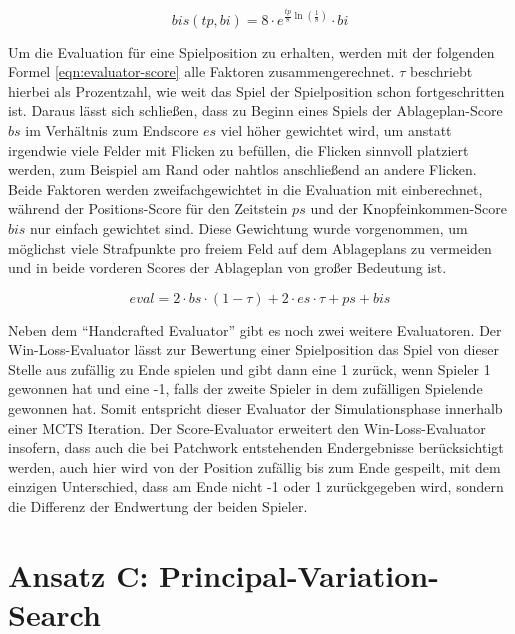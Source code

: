 \begin{equation}
    \label{eqn:button-income-score}
    bis(tp, bi) = 8 \cdot e^{\frac{tp}{8}\ln\left(\frac{1}{8}\right)} \cdot bi
\end{equation}

Um die Evaluation für eine Spielposition zu erhalten, werden mit der folgenden Formel \ref{eqn:evaluator-score} alle Faktoren zusammengerechnet. $\tau$ beschriebt hierbei als Prozentzahl, wie weit das Spiel der Spielposition schon fortgeschritten ist. Daraus lässt sich schließen, dass zu Beginn eines Spiels der Ablageplan-Score $bs$ im Verhältnis zum Endscore $es$ viel höher gewichtet wird, um anstatt irgendwie viele Felder mit Flicken zu befüllen, die Flicken sinnvoll platziert werden, zum Beispiel am Rand oder nahtlos anschließend an andere Flicken. Beide Faktoren werden zweifachgewichtet in die Evaluation mit einberechnet, während der Positions-Score für den Zeitstein $ps$ und der Knopfeinkommen-Score $bis$ nur einfach gewichtet sind. Diese Gewichtung wurde vorgenommen, um möglichst viele Strafpunkte pro freiem Feld auf dem Ablageplans zu vermeiden und in beide vorderen Scores der Ablageplan von großer Bedeutung ist.

\begin{equation}
    \label{eqn:evaluator-score}
    eval = 2 \cdot bs \cdot (1 - \tau) + 2 \cdot es \cdot \tau + ps + bis
\end{equation}

Neben dem \enquote{Handcrafted Evaluator} gibt es noch zwei weitere Evaluatoren. Der Win-Loss-Evaluator lässt zur Bewertung einer Spielposition das Spiel von dieser Stelle aus zufällig zu Ende spielen und gibt dann eine 1 zurück, wenn Spieler 1 gewonnen hat und eine -1, falls der zweite Spieler in dem zufälligen Spielende gewonnen hat. Somit entspricht dieser Evaluator der Simulationsphase innerhalb einer \ac{MCTS} Iteration. Der Score-Evaluator erweitert den Win-Loss-Evaluator insofern, dass auch die bei Patchwork entstehenden Endergebnisse berücksichtigt werden, \dash auch hier wird von der Position zufällig bis zum Ende gespeilt, mit dem einzigen Unterschied, dass am Ende nicht -1 oder 1 zurückgegeben wird, sondern die Differenz der Endwertung der beiden Spieler.

\pagebreak

\section{Ansatz C: Principal-Variation-Search}
\label{section:erstellung-ansatz-b}

